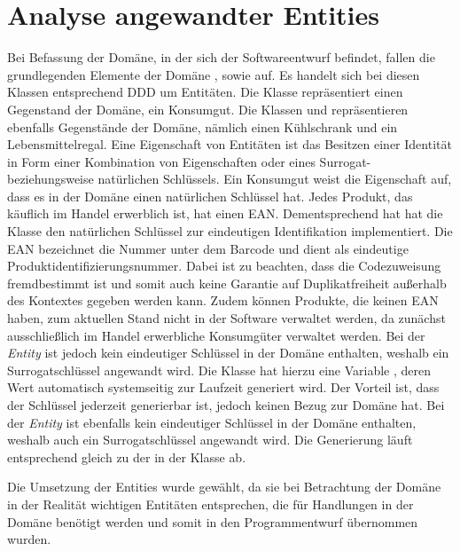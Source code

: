 \section{Analyse angewandter Entities}
\label{domaindrivendesign>entities}
Bei Befassung der Domäne, in der sich der Softwareentwurf befindet, fallen die grundlegenden Elemente der Domäne \href{}{}, \href{}{} sowie \href{}{} auf.
Es handelt sich bei diesen Klassen entsprechend \ac{DDD} um Entitäten.
Die Klasse \href{}{} repräsentiert einen Gegenstand der Domäne, ein Konsumgut.
Die Klassen \href{}{} und \href{}{} repräsentieren ebenfalls Gegenstände der Domäne, nämlich einen Kühlschrank und ein Lebensmittelregal.
Eine Eigenschaft von Entitäten ist das Besitzen einer Identität in Form einer Kombination von Eigenschaften oder eines Surrogat- beziehungsweise natürlichen Schlüssels.
Ein Konsumgut weist die Eigenschaft auf, dass es in der Domäne einen natürlichen Schlüssel hat.
Jedes Produkt, das käuflich im Handel erwerblich ist, hat einen \ac{EAN}.
Dementsprechend hat hat die Klasse \href{}{} den natürlichen Schlüssel \href{}{} zur eindeutigen Identifikation implementiert.
Die \ac{EAN} bezeichnet die Nummer unter dem Barcode und dient als eindeutige Produktidentifizierungsnummer.
Dabei ist zu beachten, dass die Codezuweisung fremdbestimmt ist und somit auch keine Garantie auf Duplikatfreiheit außerhalb des Kontextes gegeben werden kann.
Zudem können Produkte, die keinen \ac{EAN} haben, zum aktuellen Stand nicht in der Software verwaltet werden, da zunächst ausschließlich im Handel erwerbliche Konsumgüter verwaltet werden.
Bei der \textit{Entity} \href{}{} ist jedoch kein eindeutiger Schlüssel in der Domäne enthalten, weshalb ein Surrogatschlüssel angewandt wird.
Die Klasse \href{}{} hat hierzu eine Variable \href{}{}, deren Wert automatisch systemseitig zur Laufzeit generiert wird.
Der Vorteil ist, dass der Schlüssel jederzeit generierbar ist, jedoch keinen Bezug zur Domäne hat.
Bei der \textit{Entity} \href{}{} ist ebenfalls kein eindeutiger Schlüssel in der Domäne enthalten, weshalb auch ein Surrogatschlüssel angewandt wird.
Die Generierung läuft entsprechend gleich zu der in der Klasse \href{}{} ab.

Die Umsetzung der Entities wurde gewählt, da sie bei Betrachtung der Domäne in der Realität wichtigen Entitäten entsprechen, die für Handlungen in der Domäne benötigt werden und somit in den Programmentwurf übernommen wurden.

